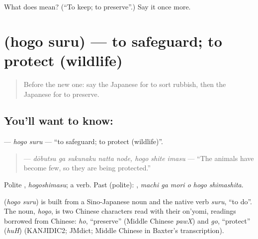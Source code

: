 \begin{tcolorbox}[breakable,colback=teal!4,colframe=teal!35!black,title={Before you move on}]
What does  mean? (\textquotedblleft{}To keep; to preserve\textquotedblright{}.) Say it once more.
\end{tcolorbox}
\section[\texorpdfstring{\ja{ほごする} (hogo suru)}{ほごする (hogo suru)}]{ (hogo suru) — to safeguard; to protect (wildlife)}

\label{lesson:JA-C339-hogo-suru}



\begin{quote}
Before the new one: say the Japanese for to sort rubbish, then the Japanese for to preserve.
\end{quote}

\subsection*{You'll want to know: }
\textbf{} — \emph{hogo suru} — \textquotedblleft{}to safeguard; to protect (wildlife)\textquotedblright{}.

\begin{quote}
\textbf{  } — \emph{dōbutsu ga sukunaku natta node, hogo shite imasu} — \textquotedblleft{}The animals have become few, so they are being protected.\textquotedblright{}
\end{quote}

Polite \textbf{}, \emph{hogoshimasu}; a  verb. Past (polite): \textbf{  }, \emph{machi ga mori o hogo shimashita}.

\begin{cousinweb}
\textbf{} (\emph{hogo suru}) is built from a Sino-Japanese noun and the native verb \emph{suru}, \textquotedblleft{}to do\textquotedblright{}. The noun, \emph{hogo}, is two Chinese characters read with their on'yomi, readings borrowed from Chinese: \emph{ho}, \textquotedblleft{}preserve\textquotedblright{} (Middle Chinese \emph{pawX}) and \emph{go}, \textquotedblleft{}protect\textquotedblright{} (\emph{huH}) (KANJIDIC2; JMdict; Middle Chinese in Baxter's transcription).
\end{cousinweb}

